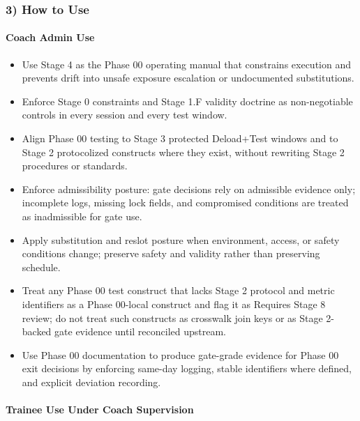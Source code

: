 \documentclass[10pt]{article}
\begin{document}
\subsubsection*{3) How to Use}

\paragraph*{Coach Admin Use}

\begin{itemize}
\item Use Stage 4 as the Phase 00 operating manual that constrains execution and prevents drift into unsafe exposure escalation or undocumented substitutions.
\item Enforce Stage 0 constraints and Stage 1.F validity doctrine as non-negotiable controls in every session and every test window.
\item Align Phase 00 testing to Stage 3 protected Deload+Test windows and to Stage 2 protocolized constructs where they exist, without rewriting Stage 2 procedures or standards.
\item Enforce admissibility posture: gate decisions rely on admissible evidence only; incomplete logs, missing lock fields, and compromised conditions are treated as inadmissible for gate use.
\item Apply substitution and reslot posture when environment, access, or safety conditions change; preserve safety and validity rather than preserving schedule.
\item Treat any Phase 00 test construct that lacks Stage 2 protocol and metric identifiers as a Phase 00-local construct and flag it as Requires Stage 8 review; do not treat such constructs as crosswalk join keys or as Stage 2-backed gate evidence until reconciled upstream.
\item Use Phase 00 documentation to produce gate-grade evidence for Phase 00 exit decisions by enforcing same-day logging, stable identifiers where defined, and explicit deviation recording.
\end{itemize}

\paragraph*{Trainee Use Under Coach Supervision}
\end{document}
